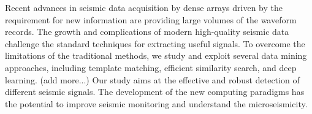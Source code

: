Recent advances in seismic data acquisition by dense arrays driven by the requirement for new information are providing large volumes of the waveform records. 
The growth and complications of modern high-quality seismic data challenge the standard techniques for extracting useful signals. 
To overcome the limitations of the traditional methods, 
we study and exploit several data mining approaches, including template matching, efficient similarity search, and deep learning. 
(add more...)
Our study aims at the effective and robust detection of different seismic signals. 
The development of the new computing paradigms has the potential to improve seismic monitoring and understand the microseismicity.   